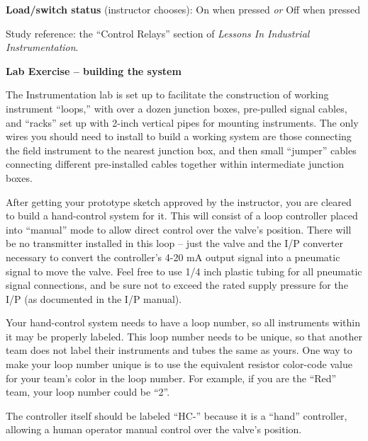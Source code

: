 \documentclass[12pt,a4paper]{article}
\begin{document}
\begin{itemize}
\vskip 20pt

\noindent
{\bf Load/switch status} (instructor chooses): \hskip 20pt \underbar{\hskip 20pt} On when pressed \hskip 10pt {\it or} \hskip 10pt \underbar{\hskip 20pt} Off when pressed

\vfil

Study reference: the ``Control Relays'' section of {\it Lessons In Industrial Instrumentation}.







\vfil \eject

\noindent
{\bf Lab Exercise -- building the system}

\vskip 5pt

The Instrumentation lab is set up to facilitate the construction of working instrument ``loops,'' with over a dozen junction boxes, pre-pulled signal cables, and ``racks'' set up with 2-inch vertical pipes for mounting instruments.  The only wires you should need to install to build a working system are those connecting the field instrument to the nearest junction box, and then small ``jumper'' cables connecting different pre-installed cables together within intermediate junction boxes.

After getting your prototype sketch approved by the instructor, you are cleared to build a hand-control system for it.  This will consist of a loop controller placed into ``manual'' mode to allow direct control over the valve's position.  There will be no transmitter installed in this loop -- just the valve and the I/P converter necessary to convert the controller's 4-20 mA output signal into a pneumatic signal to move the valve.  Feel free to use 1/4 inch plastic tubing for all pneumatic signal connections, and be sure not to exceed the rated supply pressure for the I/P (as documented in the I/P manual).

Your hand-control system needs to have a loop number, so all instruments within it may be properly labeled.  This loop number needs to be unique, so that another team does not label their instruments and tubes the same as yours.  One way to make your loop number unique is to use the equivalent resistor color-code value for your team's color in the loop number.  For example, if you are the ``Red'' team, your loop number could be ``2''. 

The controller itself should be labeled ``HC-'' because it is a ``hand'' controller, allowing a human operator manual control over the valve's position.


\end{itemize}
\end{document}
